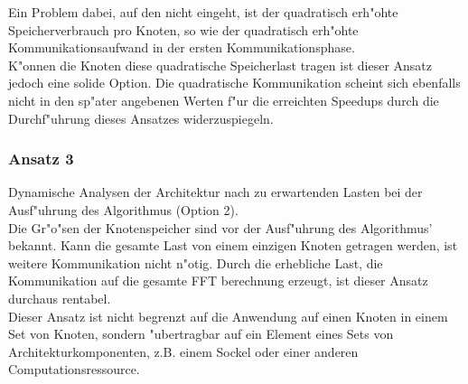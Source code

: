 Ein Problem dabei, auf den \cite{mainpaper} nicht eingeht, ist der quadratisch erh"ohte Speicherverbrauch pro Knoten, so wie der quadratisch erh"ohte Kommunikationsaufwand in der ersten Kommunikationsphase.\\
K"onnen die Knoten diese quadratische Speicherlast tragen ist dieser Ansatz jedoch eine solide Option. Die quadratische Kommunikation scheint sich ebenfalls nicht in den sp"ater angebenen Werten f"ur die erreichten Speedups durch die Durchf"uhrung dieses Ansatzes widerzuspiegeln.

\subsubsection{Ansatz 3}
Dynamische Analysen der Architektur nach zu erwartenden Lasten bei der Ausf"uhrung des Algorithmus (Option 2).\\ Die Gr"o"sen der Knotenspeicher sind vor der Ausf"uhrung des Algorithmus' bekannt. Kann die gesamte Last von einem einzigen Knoten getragen werden, ist weitere Kommunikation nicht n"otig. Durch die erhebliche Last, die Kommunikation auf die gesamte FFT berechnung erzeugt, ist dieser Ansatz durchaus rentabel.\\

Dieser Ansatz ist nicht begrenzt auf die Anwendung auf einen Knoten in einem Set von Knoten, sondern "ubertragbar auf ein Element eines Sets von Architekturkomponenten, z.B. einem Sockel oder einer anderen Computationsressource.

